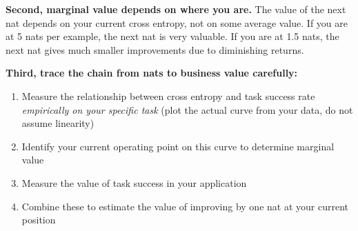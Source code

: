 \textbf{Second, marginal value depends on where you are.} The value of the next nat depends on your current cross entropy, not on some average value. If you are at 5 nats per example, the next nat is very valuable. If you are at 1.5 nats, the next nat gives much smaller improvements due to diminishing returns.

\textbf{Third, trace the chain from nats to business value carefully:}

\begin{enumerate}
\item Measure the relationship between cross entropy and task success rate \emph{empirically on your specific task} (plot the actual curve from your data, do not assume linearity)
\item Identify your current operating point on this curve to determine marginal value
\item Measure the value of task success in your application
\item Combine these to estimate the value of improving by one nat at your current position
\end{enumerate}

\vspace{1.5em}

